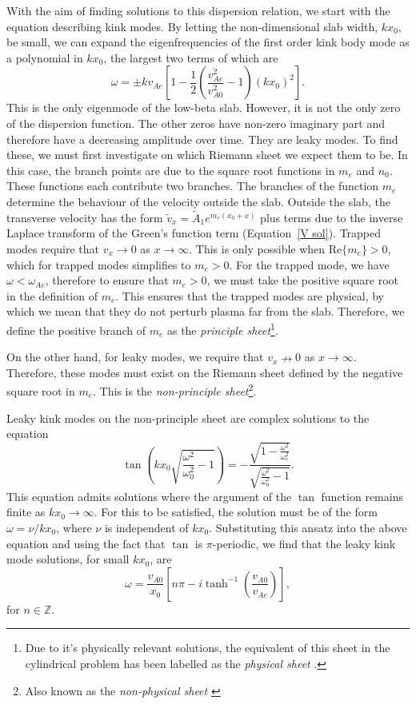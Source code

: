 \documentclass[12pt]{../style-files/ociamthesis}
\begin{document}
With the aim of finding solutions to this dispersion relation, we start with the equation describing kink modes. By letting the non-dimensional slab width, $kx_0$, be small, we can expand the eigenfrequencies of the first order kink body mode as a polynomial in $kx_0$, the largest two terms of which are
\begin{equation}
\omega = \pm kv_{Ae}\left[ 1 - \frac{1}{2}\left( \frac{v_{Ae}^2}{v_{A0}^2} - 1 \right) (kx_0)^2 \right].
\end{equation}
This is the only eigenmode of the low-beta slab. However, it is not the only zero of the dispersion function. The other zeros have non-zero imaginary part and therefore have a decreasing amplitude over time. They are leaky modes. To find these, we must first investigate on which Riemann sheet we expect them to be. In this case, the branch points are due to the square root functions in $m_e$ and $n_0$. These functions each contribute two branches. The branches of the function $m_e$ determine the behaviour of the velocity outside the slab. Outside the slab, the transverse velocity has the form $\tilde{v}_x = \tilde{A}_1e^{m_e(x_0 + x)}$ plus terms due to the inverse Laplace transform of the Green's function term (Equation~\ref{V sol}). Trapped modes require that $v_x \to 0$ as $x \to \infty$. This is only possible when $\mathrm{Re}\{m_e\} > 0$, which for trapped modes simplifies to $m_e > 0$. For the trapped mode, we have $\omega < \omega_{Ae}$, therefore to ensure that $m_e > 0$, we must take the positive square root in the definition of $m_e$. This ensures that the trapped modes are physical, by which we mean that they do not perturb plasma far from the slab. Therefore, we define the positive branch of $m_e$ as the \textit{principle sheet}\footnote{Due to it's physically relevant solutions, the equivalent of this sheet in the cylindrical problem has been labelled as the \textit{physical sheet} \citep{rud_etal06b}.}.

On the other hand, for leaky modes, we require that $v_x \nrightarrow 0$ as $x \to \infty$. Therefore, these modes must exist on the Riemann sheet defined by the negative square root in $m_e$. This is the \textit{non-principle sheet}\footnote{Also known as the \textit{non-physical sheet} \citep{rud_etal06b}}.

Leaky kink modes on the non-principle sheet are complex solutions to the equation
\begin{equation}
\tan\left(kx_0\sqrt{\frac{\omega^2}{\omega_0^2} - 1}\right) = -\frac{\sqrt{1 - \frac{\omega^2}{\omega_e^2}}}{\sqrt{\frac{\omega^2}{\omega_0^2} - 1}}.
\end{equation}
This equation admits solutions where the argument of the $\tan$ function remains finite as $kx_0 \to \infty$. For this to be satisfied, the solution must be of the form $\omega = \nu / kx_0$, where $\nu$ is independent of $kx_0$. Substituting this ansatz into the above equation and using the fact that $\tan$ is $\pi$-periodic, we find that the leaky kink mode solutions, for small $kx_0$, are
\begin{equation}
\omega = \frac{v_{A0}}{x_0}\left[ n\pi - i\tanh^{-1}\left( \frac{v_{A0}}{v_{Ae}} \right) \right],
\end{equation}
for $n \in \mathbb{Z}$.
\end{document}
